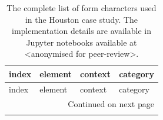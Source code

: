 \begin{longtable}{p{5cm}p{4cm}p{4cm}l}
    \caption{The complete list of form characters used in the Houston case study. The implementation details are available
    in Jupyter notebooks available at <anonymised for peer-review>.}
    \label{tab:form_hou} \\
    \toprule
                                   index &                         element &                    context &     category \\
    \midrule
    \endfirsthead

    \toprule
                                   index &                         element &                    context &     category \\
    \midrule
    \endhead
    \midrule
    \multicolumn{4}{r}{{Continued on next page}} \\
    \midrule
    \endfoot


\end{longtable}
